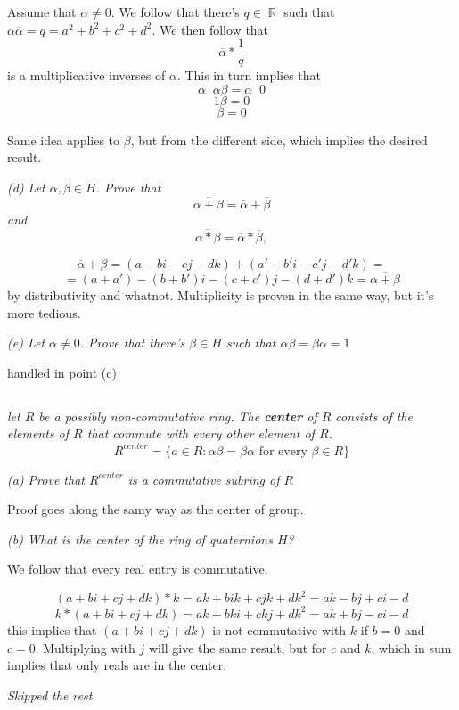 \documentclass[11pt,oneside,titlepage]{book}
\DeclareMathOperator \real {\mathbb {R}}
\DeclareMathOperator \inv {^{-1}}
\newcommand{\set}[1]{\{ #1 \}}
\begin{document}
Assume that $\alpha \neq 0$. We follow that there's $q \in \real$ such
that $\alpha \overline \alpha = q = a^2 + b^2 + c^2 + d^2$. We then
follow that
$$\overline{\alpha} * \frac{1}{q}$$
is a multiplicative inverses of $\alpha$. This in turn implies that
$$\alpha\inv \alpha \beta = \alpha \inv 0$$
$$1 \beta =  0$$
$$\beta =  0$$

Same idea applies to $\beta$, but from the different side, which
implies the desired result.

\textit{(d) Let $\alpha, \beta \in H$. Prove that
  $$\overline{\alpha + \beta} = \overline \alpha + \overline \beta$$
  and
  $$\overline{\alpha * \beta} = \overline \alpha * \overline \beta, $$
}

$$\overline \alpha + \overline \beta = (a - bi - cj - dk) + (a' - b'i - c'j - d'k) = $$
$$= (a + a') - (b + b')i - (c + c')j - (d + d')k =  \overline{\alpha + \beta}$$
by distributivity and whatnot. Multiplicity is proven in the same way,
but it's more tedious.

\textit{(e) Let $\alpha \neq 0$. Prove that there's $\beta \in H$ such
that $\alpha \beta = \beta \alpha = 1$}

handled in point (c)

\subsection{}

\textit{let $R$ be a possibly non-commutative ring. The
\textbf{center} of $R$ consists of the elements of $R$ that commute
with every other element of $R$.
  $$R^{center} = \set{a \in R: \alpha \beta = \beta \alpha \text{ for every } \beta \in R}$$
}

\textit{(a) Prove that $R^{center}$ is a commutative subring of $R$}

Proof goes along the samy way as the center of group.

\textit{(b) What is the center of the ring of quaternions $H$?}

We follow that every real entry is commutative.

$$(a + bi + cj + dk) * k = ak + bik + cjk + dk^2 = ak - bj + ci - d$$
$$k * (a + bi + cj + dk) = ak + bki + ckj + dk^2 = ak + bj - ci - d$$
this implies that $(a + bi + cj + dk)$ is not commutative with $k$ if
$b = 0$ and $c = 0$. Multiplying with $j$ will give the same result,
but for $c$ and $k$, which in sum implies that only reals are in the
center.

\textit{Skipped the rest}
\end{document}
